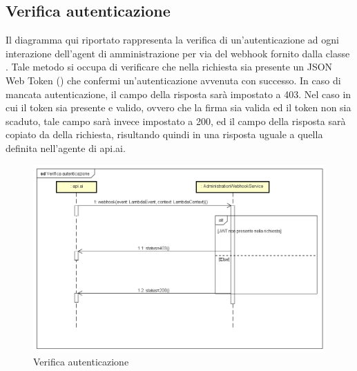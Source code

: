 \subsection{Verifica autenticazione}
Il diagramma qui riportato rappresenta la verifica di un'autenticazione ad ogni interazione dell'agent di amministrazione per via del webhook fornito dalla classe . Tale metodo si occupa di verificare che nella richiesta sia presente un JSON Web Token () che confermi un'autenticazione avvenuta con successo. In caso di mancata autenticazione, il campo  della risposta sarà impostato a 403. Nel caso in cui il token sia presente e valido, ovvero che la firma sia valida ed il token non sia scaduto, tale campo sarà invece impostato a 200, ed il campo  della risposta sarà copiato da  della richiesta, risultando quindi in una risposta uguale a quella definita nell'agente di api.ai.
 \begin{figure}[h] \centering \includegraphics[width=\textwidth,height=\textheight,keepaspectratio]{images/diagrams/back-end/Ufficial_Backend/Verificaautenticazione.png} 	\caption{Verifica autenticazione}
\end{figure}
\newpage


